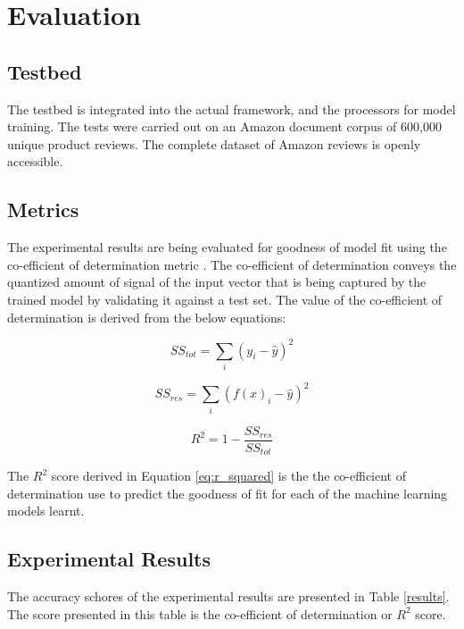 \documentclass[conference]{IEEEtran}
\begin{document}
\vspace{5mm}

\section{Evaluation}

    \subsection{Testbed}
        The testbed is integrated into the actual framework, and the processors for model training.
        The tests were carried out on an Amazon document corpus of 600,000 unique product reviews.
        The complete dataset of Amazon reviews is openly accessible\cite{amazon_datasets}.

    \subsection{Metrics}
        The experimental results are being evaluated for goodness of model fit using the co-efficient of determination metric \cite{jaeger1990statistics}.
        The co-efficient of determination conveys the quantized amount of signal of the input vector that is being captured by the trained model by validating it against a test set. 
        The value of the co-efficient of determination is derived from the below equations:

        \begin{equation}
            \displaystyle SS_{tot} = \sum_{i} (y_i - \hat{y})^2
        \end{equation}

        \begin{equation}
            \displaystyle SS_{res} = \sum_{i} (f(x)_i - \hat{y})^2
        \end{equation}

        \begin{equation} \label{eq:r_squared}
            \displaystyle R^2 = 1 - \frac{SS_{res}}{SS_{tot}}
        \end{equation}

        The $R^2$ score derived in Equation \ref{eq:r_squared} is the the co-efficient of determination use to predict the goodness of fit for each of the machine learning models learnt.


    \subsection{Experimental Results}
        The accuracy schores of the experimental results are presented in Table \ref{results}. The score presented in this table is the co-efficient of determination or $R^2$ score.
\end{document}
